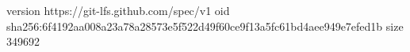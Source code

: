 version https://git-lfs.github.com/spec/v1
oid sha256:6f4192aa008a23a78a28573e5f522d49f60ce9f13a5fc61bd4aee949e7efed1b
size 349692
